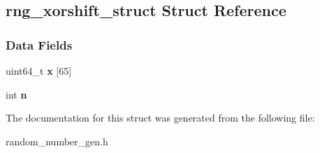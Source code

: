 \hypertarget{structrng__xorshift__struct}{}\subsection{rng\+\_\+xorshift\+\_\+struct Struct Reference}
\label{structrng__xorshift__struct}
\subsubsection*{Data Fields}
\begin{DoxyCompactItemize}
\item 
\mbox{\label{structrng__xorshift__struct_ad6197a620f2c60cbe0c66534ea9247ee}} 
uint64\+\_\+t {\bfseries x} \mbox{[}65\mbox{]}
\item 
\mbox{\label{structrng__xorshift__struct_aca14bb6aaea04bbda0fe84a57ea632b4}} 
int {\bfseries n}
\end{DoxyCompactItemize}


The documentation for this struct was generated from the following file\+:\begin{DoxyCompactItemize}
\item 
random\+\_\+number\+\_\+gen.\+h\end{DoxyCompactItemize}
